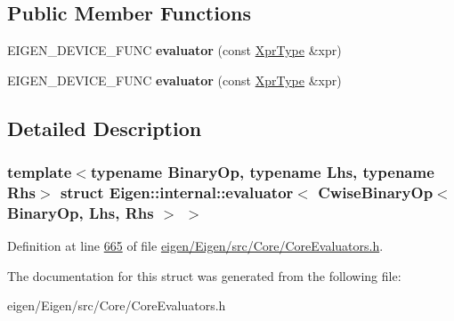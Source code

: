 \subsection*{Public Member Functions}
\begin{DoxyCompactItemize}
\item 
\mbox{\label{struct_eigen_1_1internal_1_1evaluator_3_01_cwise_binary_op_3_01_binary_op_00_01_lhs_00_01_rhs_01_4_01_4_a90a8f3157957b9a4ebd6893c28926aca}} 
E\+I\+G\+E\+N\+\_\+\+D\+E\+V\+I\+C\+E\+\_\+\+F\+U\+NC {\bfseries evaluator} (const \hyperlink{group___core___module_class_eigen_1_1_cwise_binary_op}{Xpr\+Type} \&xpr)
\item 
\mbox{\label{struct_eigen_1_1internal_1_1evaluator_3_01_cwise_binary_op_3_01_binary_op_00_01_lhs_00_01_rhs_01_4_01_4_a90a8f3157957b9a4ebd6893c28926aca}} 
E\+I\+G\+E\+N\+\_\+\+D\+E\+V\+I\+C\+E\+\_\+\+F\+U\+NC {\bfseries evaluator} (const \hyperlink{group___core___module_class_eigen_1_1_cwise_binary_op}{Xpr\+Type} \&xpr)
\end{DoxyCompactItemize}


\subsection{Detailed Description}
\subsubsection*{template$<$typename Binary\+Op, typename Lhs, typename Rhs$>$\newline
struct Eigen\+::internal\+::evaluator$<$ Cwise\+Binary\+Op$<$ Binary\+Op, Lhs, Rhs $>$ $>$}



Definition at line \hyperlink{eigen_2_eigen_2src_2_core_2_core_evaluators_8h_source_l00665}{665} of file \hyperlink{eigen_2_eigen_2src_2_core_2_core_evaluators_8h_source}{eigen/\+Eigen/src/\+Core/\+Core\+Evaluators.\+h}.



The documentation for this struct was generated from the following file\+:\begin{DoxyCompactItemize}
\item 
eigen/\+Eigen/src/\+Core/\+Core\+Evaluators.\+h\end{DoxyCompactItemize}

